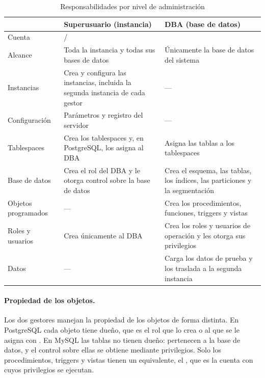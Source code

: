 \begin{table}[H]
	\centering
	\small
	\caption{Responsabilidades por nivel de administración}
	\label{tab:responsabilidades}
	\begin{tabular}{@{}L{3.6cm} L{6.2cm} L{6.2cm}@{}}
		\toprule
		& \textbf{Superusuario (instancia)} & \textbf{DBA (base de datos)} \\
		\midrule
		Cuenta &  /  &  \\
		Alcance & Toda la instancia y todas sus bases de datos & Únicamente la base de datos del sistema \\
		Instancias & Crea y configura las instancias, incluida la segunda instancia de cada gestor & --- \\
		Configuración & Parámetros y registro del servidor & --- \\
		Tablespaces & Crea los tablespaces y, en PostgreSQL, los asigna al DBA & Asigna las tablas a los tablespaces \\
		Base de datos & Crea el rol del DBA y le otorga control sobre la base de datos & Crea el esquema, las tablas, los índices, las particiones y la segmentación \\
		Objetos programados & --- & Crea los procedimientos, funciones, triggers y vistas \\
		Roles y usuarios & Crea únicamente al DBA & Crea los roles y usuarios de operación y les otorga sus privilegios \\
		Datos & --- & Carga los datos de prueba y los traslada a la segunda instancia \\
		\bottomrule
	\end{tabular}
\end{table}

\paragraph{Propiedad de los objetos.} Los dos gestores manejan la propiedad de los objetos de forma distinta. En PostgreSQL cada objeto tiene dueño, que es el rol que lo crea o al que se le asigna con . En MySQL las tablas no tienen dueño: pertenecen a la base de datos, y el control sobre ellas se obtiene mediante privilegios. Solo los procedimientos, triggers y vistas tienen un equivalente, el , que es la cuenta con cuyos privilegios se ejecutan.

